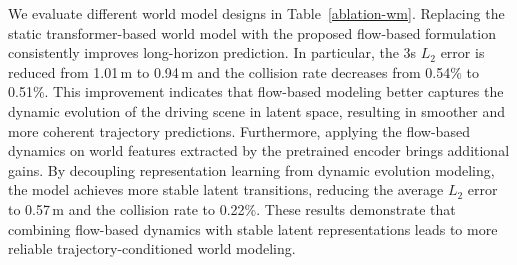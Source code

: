 \begin{table}[t]
    \centering
    \setlength{\tabcolsep}{8pt} 
    \vspace{1mm}
    \caption{\textbf{Component-wise Ablation.} Static-WM and Dyn-WM mean the existing stable world model design and our flow-based dynamic modeling. MS denotes the strategy of stability-aware multi-mode selection. FPS are measured on one RTX 4090.}
    \vspace{-8mm}
    \label{Component-Ablation}
\end{table}



We evaluate different world model designs in Table~\ref{ablation-wm}. 
Replacing the static transformer-based world model with the proposed flow-based formulation consistently improves long-horizon prediction. 
In particular, the 3s $L_2$ error is reduced from 1.01\,m to 0.94\,m and the collision rate decreases from 0.54\% to 0.51\%. 
This improvement indicates that flow-based modeling better captures the dynamic evolution of the driving scene in latent space, resulting in smoother and more coherent trajectory predictions.
Furthermore, applying the flow-based dynamics on world features extracted by the pretrained encoder brings additional gains.
By decoupling representation learning from dynamic evolution modeling, the model achieves more stable latent transitions, reducing the average $L_2$ error to 0.57\,m and the collision rate to 0.22\%. 
These results demonstrate that combining flow-based dynamics with stable latent representations leads to more reliable trajectory-conditioned world modeling.

